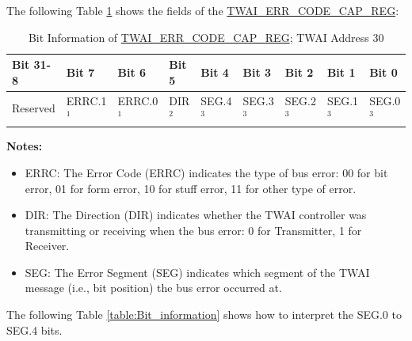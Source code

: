 \documentclass[main\_\_EN.tex]{subfiles}
\begin{document}
The following Table \ref{table:ECC_REG1} shows the fields of the \hyperref[regdesc:TWAIERRCODECAPREG]{TWAI\_ERR\_CODE\_CAP\_REG}:

\begin{longtable}[c]{|p{1.4cm}|p{1.4cm}|p{1.4cm}|p{1.4cm}|p{1.4cm}|p{1.4cm}|p{1.4cm}|p{1.4cm}|p{1.4cm}|}
    \caption{Bit Information of \hyperref[regdesc:TWAIERRCODECAPREG]{TWAI\_ERR\_CODE\_CAP\_REG}; TWAI Address \hexprefix{}30}
    \label{table:ECC_REG1}\\
    \hline
    \rowcolor{lightgray}
    Bit 31-8 & Bit 7 & Bit 6 & Bit 5 & Bit 4 & Bit 3 & Bit 2 & Bit 1 & Bit 0\\\hline
    Reserved & ERRC.1$^1$ & ERRC.0$^1$ & DIR$^2$ & SEG.4$^3$ & SEG.3$^3$ & SEG.2$^3$ & SEG.1$^3$ & SEG.0$^3$\\
    \hline
\end{longtable}
\vspace{-1.5em}
{\bfseries Notes:}\\
\begin{itemize}
    \item ERRC: The Error Code (ERRC) indicates the type of bus error: 00 for bit error, 01 for form error, 10 for stuff error, 11 for other type of error.
    \item DIR: The Direction (DIR) indicates whether the TWAI controller was transmitting or receiving when the bus error: 0 for Transmitter, 1 for Receiver.
    \item SEG: The Error Segment (SEG) indicates which segment of the TWAI message (i.e., bit position) the bus error occurred at.
\end{itemize}

The following Table \ref{table:Bit_information} shows how to interpret the SEG.0 to SEG.4 bits.
\end{document}
